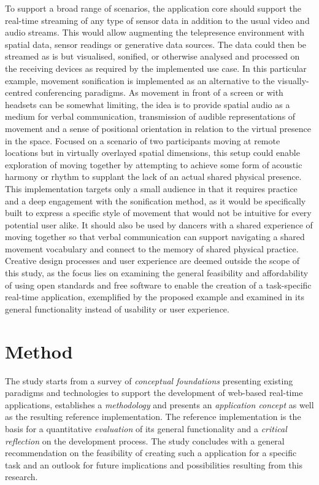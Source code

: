 To support a broad range of scenarios, the application core should support the real-time streaming of any type of sensor data in addition to the usual video and audio streams.
This would allow augmenting the telepresence environment with spatial data, sensor readings or generative data sources.
The data could then be streamed as is but visualised, sonified, or otherwise analysed and processed on the receiving devices as required by the implemented use case.
In this particular example, movement sonification is implemented as an alternative to the visually-centred conferencing paradigms.
As movement in front of a screen or with headsets can be somewhat limiting, the idea is to provide spatial audio as a medium for verbal communication, transmission of audible representations of movement and a sense of positional orientation in relation to the virtual presence in the space.
Focused on a scenario of two participants moving at remote locations but in virtually overlayed spatial dimensions, this setup could enable exploration of moving together by attempting to achieve some form of acoustic harmony or rhythm to supplant the lack of an actual shared physical presence.
This implementation targets only a small audience in that it requires practice and a deep engagement with the sonification method, as it would be specifically built to express a specific style of movement that would not be intuitive for every potential user alike.
It should also be used by dancers with a shared experience of moving together so that verbal communication can support navigating a shared movement vocabulary and connect to the memory of shared physical practice.
Creative design processes and user experience are deemed outside the scope of this study, as the focus lies on examining the general feasibility and affordability of using open standards and free software to enable the creation of a task-specific real-time application, exemplified by the proposed example and examined in its general functionality instead of usability or user experience.

\section{Method}

The study starts from a survey of \emph{conceptual foundations} presenting existing paradigms and technologies to support the development of web-based real-time applications, establishes a \emph{methodology} and presents an \emph{application concept} as well as the resulting {reference implementation}.
The reference implementation is the basis for a quantitative \emph{evaluation} of its general functionality and a \emph{critical reflection} on the development process.
The study concludes with a general recommendation on the feasibility of creating such a  application for a specific task and an outlook for future implications and possibilities resulting from this research.

